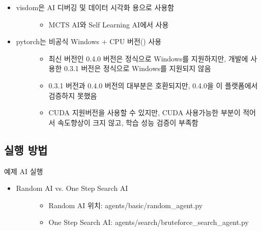\documentclass[letterpaper,10pt,english]{sphinxmanual}
\begin{document}
\begin{itemize}
\item {} \begin{description}
\item[{visdom은 AI 디버깅 및 데이터 시각화 용으로 사용함}] \leavevmode\begin{itemize}
\item {} 
MCTS AI와 Self Learning AI에서 사용

\end{itemize}

\end{description}

\item {} \begin{description}
\item[{pytorch는 비공식 Windows + CPU 버전() 사용}] \leavevmode\begin{itemize}
\item {} 
최신 버전인 0.4.0 버전은 정식으로 Windows를 지원하지만, 개발에 사용한 0.3.1 버전은 정식으로 Windows를 지원되지 않음

\item {} 
0.3.1 버전과 0.4.0 버전의 대부분은 호환되지만, 0.4.0을 이 플랫폼에서 검증하지 못했음

\item {} 
CUDA 지원버전을 사용할 수 있지만, CUDA 사용가능한 부분이 적어서 속도향상이 크지 않고, 학습 성능 검증이 부족함

\end{itemize}

\end{description}

\end{itemize}


\subsection{실행 방법}
\label{\detokenize{02-microchess_ai_platform:id5}}
예제 AI 실행
\begin{itemize}
\item {} \begin{description}
\item[{Random AI vs. One Step Search AI}] \leavevmode\begin{itemize}
\item {} 
Random AI 위치: agents/basic/random\_agent.py

\item {} 
One Step Search AI: agents/search/bruteforce\_search\_agent.py

\end{itemize}

\end{description}

\end{itemize}
\end{document}
